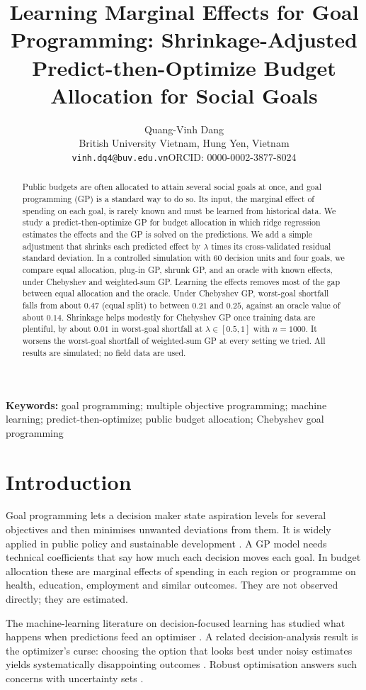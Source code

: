 \documentclass[11pt,a4paper]{article}
\title{Learning Marginal Effects for Goal Programming: Shrinkage-Adjusted Predict-then-Optimize Budget Allocation for Social Goals}
\author{Quang-Vinh Dang\\British University Vietnam, Hung Yen, Vietnam\\
\texttt{vinh.dq4@buv.edu.vn}\quad ORCID: 0000-0002-3877-8024}
\date{}
\begin{document}
\maketitle
\begin{abstract}
Public budgets are often allocated to attain several social goals at once, and goal programming (GP) is a standard way to do so. Its input, the marginal effect of spending on each goal, is rarely known and must be learned from historical data. We study a predict-then-optimize GP for budget allocation in which ridge regression estimates the effects and the GP is solved on the predictions. We add a simple adjustment that shrinks each predicted effect by $\lambda$ times its cross-validated residual standard deviation. In a controlled simulation with 60 decision units and four goals, we compare equal allocation, plug-in GP, shrunk GP, and an oracle with known effects, under Chebyshev and weighted-sum GP. Learning the effects removes most of the gap between equal allocation and the oracle. Under Chebyshev GP, worst-goal shortfall falls from about $0.47$ (equal split) to between $0.21$ and $0.25$, against an oracle value of about $0.14$. Shrinkage helps modestly for Chebyshev GP once training data are plentiful, by about $0.01$ in worst-goal shortfall at $\lambda\in[0.5,1]$ with $n=1000$. It worsens the worst-goal shortfall of weighted-sum GP at every setting we tried. All results are simulated; no field data are used.
\end{abstract}
\noindent\textbf{Keywords:} goal programming; multiple objective programming; machine learning; predict-then-optimize; public budget allocation; Chebyshev goal programming

\section{Introduction}
Goal programming \citep{charnes1961,ignizio1976,tamiz1998} lets a decision maker state aspiration levels for several objectives and then minimises unwanted deviations from them. It is widely applied in public policy and sustainable development \citep{romero1991}. A GP model needs technical coefficients that say how much each decision moves each goal. In budget allocation these are marginal effects of spending in each region or programme on health, education, employment and similar outcomes. They are not observed directly; they are estimated.

The machine-learning literature on decision-focused learning has studied what happens when predictions feed an optimiser \citep{elmachtoub2022,mandi2024}. A related decision-analysis result is the optimizer's curse: choosing the option that looks best under noisy estimates yields systematically disappointing outcomes \citep{smith2006}. Robust optimisation answers such concerns with uncertainty sets \citep{bertsimas2004}.
\end{document}
